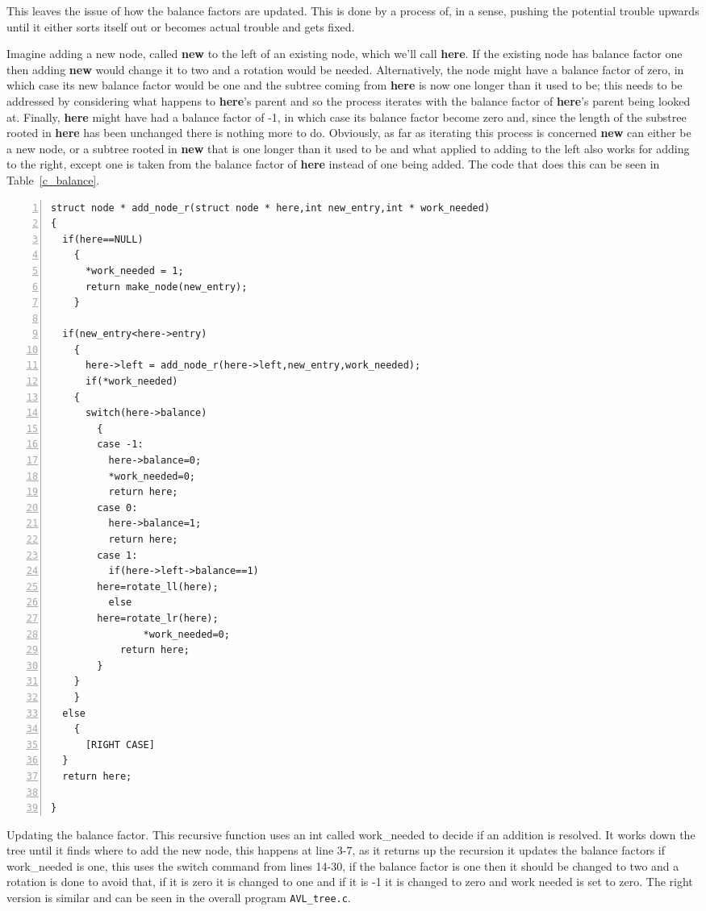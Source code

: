 \documentclass[11pt,a4paper]{scrartcl}
\begin{document}
This leaves the issue of how the balance factors are updated. This is
done by a process of, in a sense, pushing the potential trouble upwards
until it either sorts itself out or becomes actual trouble and gets
fixed.  

Imagine adding a new node, called {\bf new} to the left of an existing
node, which we'll call {\bf here}. If the existing node has balance
factor one then adding {\bf new} would change it to two and a rotation
would be needed. Alternatively, the node might have a balance factor
of zero, in which case its new balance factor would be one and the
subtree coming from {\bf here} is now one longer than it used to be;
this needs to be addressed by considering what happens to {\bf here}'s
parent and so the process iterates with the balance factor of {\bf
  here}'s parent being looked at. Finally, {\bf here} might have had a
balance factor of -1, in which case its balance factor become zero
and, since the length of the substree rooted in {\bf here} has been
unchanged there is nothing more to do. Obviously, as far as iterating
this process is concerned {\bf new} can either be a new node, or a
subtree rooted in {\bf new} that is one longer than it used to be and
what applied to adding to the left also works for adding to the right,
except one is taken from the balance factor of {\bf here} instead of
one being added. The code that does this can be seen in Table~\ref{c_balance}.

\begin{table}
\begin{lstlisting}[numbers=left]
struct node * add_node_r(struct node * here,int new_entry,int * work_needed)
{
  if(here==NULL)
    {
      *work_needed = 1;
      return make_node(new_entry);
    }
  
  if(new_entry<here->entry)
    {
      here->left = add_node_r(here->left,new_entry,work_needed);
      if(*work_needed)
	{
	  switch(here->balance)
	    {
	    case -1:
	      here->balance=0;
	      *work_needed=0;
	      return here;
	    case 0:
	      here->balance=1;
	      return here;
	    case 1:
	      if(here->left->balance==1)
		here=rotate_ll(here);
	      else
		here=rotate_lr(here);
       	        *work_needed=0;
	        return here;
	    }
	}
    }
  else
    {
      [RIGHT CASE]
  }
  return here;

}
\end{lstlisting}
\caption{Updating the balance factor. This recursive function uses an int called work\_needed to decide if an addition is resolved. It works down the tree until it finds where to add the new node, this happens at line 3-7, as it returns up the recursion it updates the balance factors if work\_needed is one, this uses the switch command from lines 14-30, if the balance factor is one then it should be changed to two and a rotation is done to avoid that, if it is zero it is changed to one and if it is -1 it is changed to zero and work needed is set to zero. The right version is similar and can be seen in the overall program {\tt AVL\_tree.c}.\label{c_balance}}
\end{table}
\end{document}
